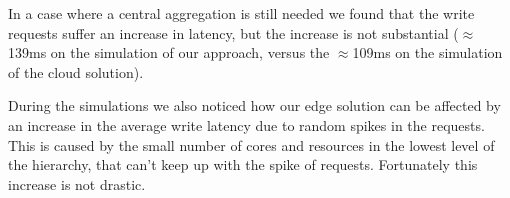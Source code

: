 In a case where a central aggregation is still needed we found that the write requests suffer an increase in latency, but the increase is not substantial ($\approx$139ms on the simulation of our approach, versus the $\approx$109ms on the simulation of the cloud solution).

During the simulations we also noticed how our edge solution can be affected by an increase in the average write latency due to random spikes in the requests. This is caused by the small number of cores and resources in the lowest level of the hierarchy, that can't keep up with the spike of requests. Fortunately this increase is not drastic.
